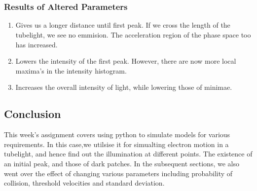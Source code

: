 \documentclass[11pt]{article}
\providecommand{\tightlist}{%
      \setlength{\itemsep}{0pt}\setlength{\parskip}{0pt}}
\begin{document}
    \begin{center}
    \end{center}
    { \hspace*{\fill} \\}
    
    \begin{center}
    \end{center}
    { \hspace*{\fill} \\}
    
    \hypertarget{results-of-altered-parameters}{%
\subsubsection{Results of Altered
Parameters}\label{results-of-altered-parameters}}

\begin{enumerate}
\def\labelenumi{\arabic{enumi}.}
\tightlist
\item
  Gives us a longer distance until first peak. If we cross the length of
  the tubelight, we see no emmision. The acceleration region of the
  phase space too has increased.
\item
  Lowers the intensity of the first peak. However, there are now more
  local maxima's in the intensity histogram.
\item
  Increases the overall intensity of light, while lowering those of
  minimae.
\end{enumerate}

    \hypertarget{conclusion}{%
\subsection{Conclusion}\label{conclusion}}

This week's assignment covers using python to simulate models for
various requirements. In this case,we utilsise it for simualting
electron motion in a tubelight, and hence find out the illumination at
different points. The existence of an initial peak, and those of dark
patches. In the subsequent sections, we also went over the effect of
changing various parameters including probability of collision,
threshold velocities and standard deviation.


    
    
    
    
\end{document}
